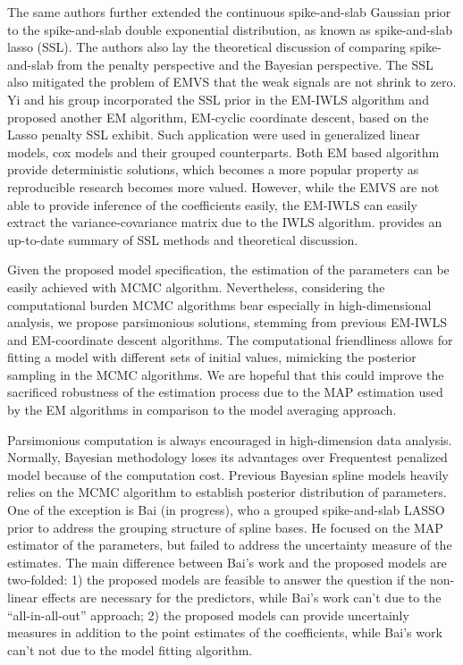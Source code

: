 \documentclass[AMA,STIX1COL,]{WileyNJD-v2}
\begin{document}
The same authors \citep{Rockova2018b, Rockova2018} further extended the
continuous spike-and-slab Gaussian prior to the spike-and-slab double
exponential distribution, as known as spike-and-slab lasso (SSL). The
authors also lay the theoretical discussion of comparing spike-and-slab
from the penalty perspective and the Bayesian perspective. The SSL also
mitigated the problem of EMVS that the weak signals are not shrink to
zero. Yi and his group incorporated the SSL prior in the EM-IWLS
algorithm and proposed another EM algorithm, EM-cyclic coordinate
descent, based on the Lasso penalty SSL exhibit. Such application were
used in generalized linear models\citep{Tang2017a}, cox models
\citep{Tang2017} and their grouped
counterparts\citep{Tang2018, Tang2019}. Both EM based algorithm provide
deterministic solutions, which becomes a more popular property as
reproducible research becomes more valued. However, while the EMVS are
not able to provide inference of the coefficients easily, the EM-IWLS
can easily extract the variance-covariance matrix due to the IWLS
algorithm. \citet{Bai2020} provides an up-to-date summary of SSL methods
and theoretical discussion.

Given the proposed model specification, the estimation of the parameters
can be easily achieved with MCMC algorithm. Nevertheless, considering
the computational burden MCMC algorithms bear especially in
high-dimensional analysis, we propose parsimonious solutions, stemming
from previous EM-IWLS \citep{Rockova2014a}and EM-coordinate descent
algorithms\citep{Tang2018, Tang2019}. The computational friendliness
allows for fitting a model with different sets of initial values,
mimicking the posterior sampling in the MCMC algorithms. We are hopeful
that this could improve the sacrificed robustness of the estimation
process due to the MAP estimation used by the EM algorithms in
comparison to the model averaging approach.

Parsimonious computation is always encouraged in high-dimension data
analysis. Normally, Bayesian methodology loses its advantages over
Frequentest penalized model because of the computation cost. Previous
Bayesian spline models heavily relies on the MCMC algorithm to establish
posterior distribution of parameters. One of the exception is Bai (in
progress), who a grouped spike-and-slab LASSO prior \citep{Rockova2018}
to address the grouping structure of spline bases. He focused on the MAP
estimator of the parameters, but failed to address the uncertainty
measure of the estimates. The main difference between Bai's work and the
proposed models are two-folded: 1) the proposed models are feasible to
answer the question if the non-linear effects are necessary for the
predictors, while Bai's work can't due to the ``all-in-all-out''
approach; 2) the proposed models can provide uncertainly measures in
addition to the point estimates of the coefficients, while Bai's work
can't not due to the model fitting algorithm.
\end{document}

